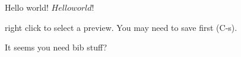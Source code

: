 \documentclass[12pt]{article}
\begin{document}
Hello world!
$Hello world!$ %


right click to select a preview. You may need to save first (C-s).

It seems you need bib stuff?

\cite{kitchin-2015-examp-effec}



\end{document}
